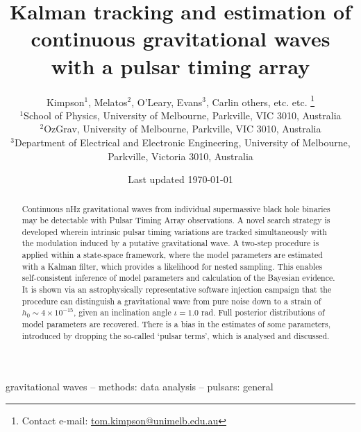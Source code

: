 \documentclass[fleqn,usenatbib,useAMS]{mnras}
\title[Kalman PTA]{Kalman tracking and estimation of continuous gravitational waves with a pulsar timing array}
\author[Kimpson]{Kimpson$^{1}$, Melatos$^{2}$, O'Leary, Evans$^{3}$, Carlin others, etc. etc.%
\thanks{Contact e-mail: \href{tom.kimpson@unimelb.edu.au}{tom.kimpson@unimelb.edu.au}}%
\\
$^{1}$School of Physics, University of Melbourne, Parkville, VIC 3010, Australia \\
$^{2}$OzGrav, University of Melbourne, Parkville, VIC 3010, Australia \\
$^{3}$Department of Electrical and Electronic Engineering, University of Melbourne, Parkville, Victoria 3010, Australia }
\date{Last updated \today}
\begin{document}
\label{firstpage}
\pagerange{\pageref{firstpage}--\pageref{lastpage}}
\maketitle

\begin{abstract}	
Continuous nHz gravitational waves from individual supermassive black hole binaries may be detectable with Pulsar Timing Array observations. A novel search strategy is developed wherein intrinsic pulsar timing variations are tracked simultaneously with the modulation induced by a putative gravitational wave. A two-step procedure is applied within a state-space framework, where the model parameters are estimated with a Kalman filter, which provides a likelihood for nested sampling. This enables self-consistent inference of model parameters and calculation of the Bayesian evidence. It is shown via an astrophysically representative software injection campaign that the procedure can distinguish a gravitational wave from pure noise down to a strain of $h_0 \sim 4 \times 10^{-15}$, given an inclination angle $\iota = 1.0$ rad. Full posterior distributions of model parameters are recovered. There is a bias in the estimates of some parameters, introduced by dropping the so-called `pulsar terms', which is analysed and discussed.
\end{abstract}

\begin{keywords}
gravitational waves -- methods: data analysis -- pulsars: general
\end{keywords}



\begingroup
\let\clearpage\relax
\endgroup
\newpage
\end{document}

